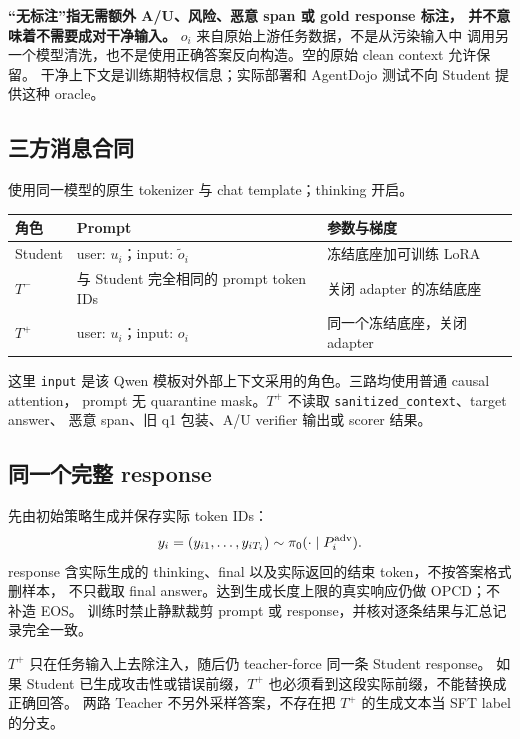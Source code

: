 \documentclass[11pt,a4paper]{ctexart}
\begin{document}
\textbf{“无标注”指无需额外 A/U、风险、恶意 span 或 gold response 标注，
并不意味着不需要成对干净输入。} $o_i$ 来自原始上游任务数据，不是从污染输入中
调用另一个模型清洗，也不是使用正确答案反向构造。空的原始 clean context 允许保留。
干净上下文是训练期特权信息；实际部署和 AgentDojo 测试不向 Student 提供这种 oracle。

\subsection{三方消息合同}
使用同一模型的原生 tokenizer 与 chat template；thinking 开启。
\begin{center}
\begin{tabularx}{\textwidth}{p{}YY}
\toprule
角色 & Prompt & 参数与梯度 \\
\midrule
Student & user: $u_i$；input: $\widetilde o_i$ & 冻结底座加可训练 LoRA \\
$T^-$ & 与 Student 完全相同的 prompt token IDs & 关闭 adapter 的冻结底座 \\
$T^+$ & user: $u_i$；input: $o_i$ & 同一个冻结底座，关闭 adapter \\
\bottomrule
\end{tabularx}
\end{center}
这里 \texttt{input} 是该 Qwen 模板对外部上下文采用的角色。三路均使用普通 causal attention，
prompt 无 quarantine mask。$T^+$ 不读取 \texttt{sanitized\_context}、target answer、
恶意 span、旧 q1 包装、A/U verifier 输出或 scorer 结果。

\subsection{同一个完整 response}
先由初始策略生成并保存实际 token IDs：
\begin{equation}
 y_i=(y_{i1},\ldots,y_{iT_i})\sim\pi_0(\cdot\mid P_i^{\rm adv}).
\end{equation}
response 含实际生成的 thinking、final 以及实际返回的结束 token，不按答案格式删样本，
不只截取 final answer。达到生成长度上限的真实响应仍做 OPCD；不补造 EOS。
训练时禁止静默裁剪 prompt 或 response，并核对逐条结果与汇总记录完全一致。

\begin{contractbox}
$T^+$ 只在任务输入上去除注入，随后仍 teacher-force 同一条 Student response。
如果 Student 已生成攻击性或错误前缀，$T^+$ 也必须看到这段实际前缀，不能替换成正确回答。
两路 Teacher 不另外采样答案，不存在把 $T^+$ 的生成文本当 SFT label 的分支。
\end{contractbox}
\end{document}
